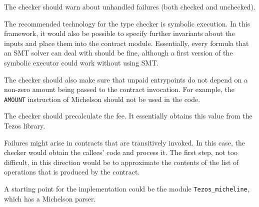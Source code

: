 \documentclass[a4paper]{llncs}
\begin{document}
The checker should warn about unhandled failures (both checked and unchecked).

The recommended technology for the type checker is symbolic
execution. In this framework, it would also 
be possible to specify further invariants about the inputs and place them into the contract
module. Essentially, every formula that an SMT solver can deal with
should be fine, although a first version of the symbolic executor
could work without using SMT.

The checker should also make sure that unpaid entrypoints do not
depend on a non-zero amount being passed to the contract
invocation. For example, the \texttt{AMOUNT} instruction of Michelson
should not be used in the code.  

The checker should precalculate the fee. It essentially obtains
this value from the Tezos library.

Failures might arise in contracts that are transitively invoked. In
this case, the checker would obtain the callees' code and process
it. The first step, not too difficult, in this direction would be to
approximate the contents of the list of operations that is produced by
the contract. 

A starting point for the implementation could be the module \lstinline/Tezos_micheline/, which has a
Michelson parser. 
\end{document}
